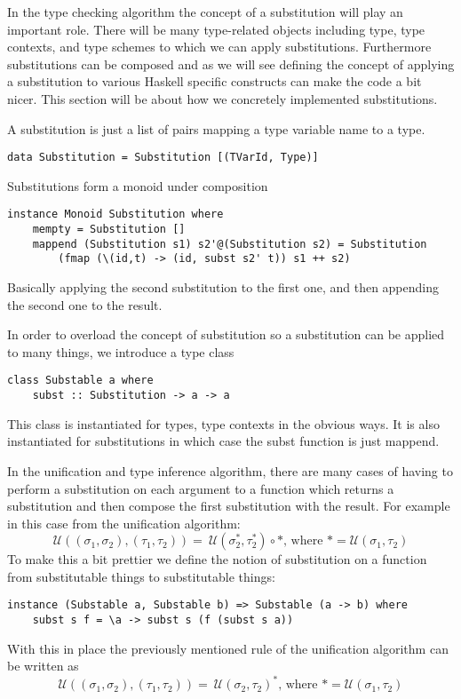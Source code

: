 \documentclass{scrartcl}
\begin{document}
In the type checking algorithm the concept of a substitution will
play an important role. There will be many type-related objects including
type, type contexts, and type schemes to which we can apply 
substitutions. Furthermore substitutions can be composed and as we
will see defining the concept of applying a substitution to various
Haskell specific constructs can make the code a bit nicer. This
section will be about how we concretely implemented substitutions.

A substitution is just a list of pairs mapping a type variable name
to a type.
\begin{lstlisting}
data Substitution = Substitution [(TVarId, Type)]
\end{lstlisting}
Substitutions form a monoid under composition
\begin{lstlisting}
instance Monoid Substitution where
    mempty = Substitution []
    mappend (Substitution s1) s2'@(Substitution s2) = Substitution  
        (fmap (\(id,t) -> (id, subst s2' t)) s1 ++ s2)
\end{lstlisting}
Basically applying the second substitution to the first one, and then
appending the second one to the result.

In order to overload the concept of substitution so a substitution
can be applied to many things, we introduce a type class
\begin{lstlisting}
class Substable a where
    subst :: Substitution -> a -> a
\end{lstlisting}
This class is instantiated for types, type contexts
in the obvious ways. It is also instantiated for substitutions in which
case the subst function is just mappend.

In the unification and type inference algorithm, there are many
cases of having to perform a substitution on each argument to a
function which returns a substitution and then compose the
first substitution with the result. For example in this case from
the unification algorithm:
\[ \mathcal{U}((\sigma_1, \sigma_2),(\tau_1, \tau_2)) = \
   \mathcal{U}(\sigma_2^*,\tau_2^*) \circ * \text{, where }
   * = \mathcal{U}(\sigma_1, \tau_2) \]
To make this a bit prettier we define the notion of substitution on
a function from substitutable things to substitutable things:
\begin{lstlisting}
instance (Substable a, Substable b) => Substable (a -> b) where
    subst s f = \a -> subst s (f (subst s a))
\end{lstlisting}
With this in place the previously mentioned rule of the unification
algorithm can be written as
\[ \mathcal{U}((\sigma_1, \sigma_2),(\tau_1, \tau_2)) = \
   \mathcal{U}(\sigma_2,\tau_2)^* \text{, where }
   * = \mathcal{U}(\sigma_1, \tau_2) \]
\end{document}

